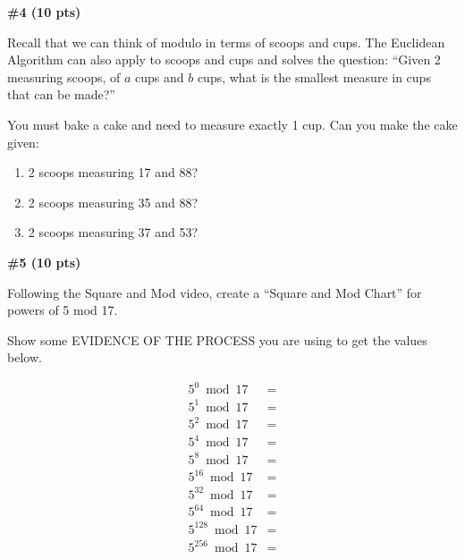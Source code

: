 \documentclass{article}
\newcommand{\sectionbreak}{\clearpage}
\begin{document}
\sectionbreak

\textbf{\#4 (10 pts)}

\bigbreak

Recall that we can think of modulo in terms of scoops and cups. The Euclidean Algorithm can also apply to scoops and cups and solves the question: ``Given 2 measuring scoops, of $a$ cups and $b$ cups, what is the smallest measure in cups that can be made?''

\bigbreak

You must bake a cake and need to measure exactly 1 cup. Can you make the cake given:

\bigbreak

\begin{enumerate}[label=\alph*.]
    \item 2 scoops measuring 17 and 88?

    \bigbreak



    \bigbreak

    \item 2 scoops measuring 35 and 88?

    \bigbreak



    \bigbreak

    \item 2 scoops measuring 37 and 53?

    \bigbreak



\end{enumerate}

\sectionbreak

\textbf{\#5 (10 pts)}

\bigbreak

Following the Square and Mod video, create a ``Square and Mod Chart'' for powers of 5 mod 17.

\bigbreak

Show some EVIDENCE OF THE PROCESS you are using to get the values below.

\bigbreak

\begin{align*}
5^0 \bmod 17 &= \\[6pt]
5^1 \bmod 17 &= \\[6pt]
5^2 \bmod 17 &= \\[6pt]
5^4 \bmod 17 &= \\[6pt]
5^8 \bmod 17 &= \\[6pt]
5^{16} \bmod 17 &= \\[6pt]
5^{32} \bmod 17 &= \\[6pt]
5^{64} \bmod 17 &= \\[6pt]
5^{128} \bmod 17 &= \\[6pt]
5^{256} \bmod 17 &=
\end{align*}
\end{document}

